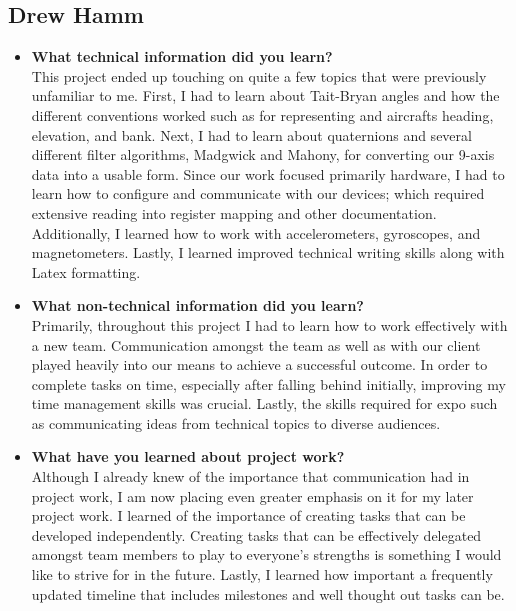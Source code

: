 	\subsection{Drew Hamm}
		\begin{itemize}
			\item \textbf{What technical information did you learn?} \\
				This project ended up touching on quite a few topics that were previously unfamiliar to me.
				First, I had to learn about Tait-Bryan angles and how the different conventions worked such as for representing and aircrafts heading, elevation, and bank.
				Next, I had to learn about quaternions and several different filter algorithms, Madgwick and Mahony, for converting our 9-axis data into a usable form.
				Since our work focused primarily hardware, I had to learn how to configure and communicate with our devices; which required extensive reading into register mapping and other documentation.
				Additionally, I learned how to work with accelerometers, gyroscopes, and magnetometers.
				Lastly, I learned improved technical writing skills along with Latex formatting. \\

			\item \textbf{What non-technical information did you learn?} \\
				Primarily, throughout this project I had to learn how to work effectively with a new team.
				Communication amongst the team as well as with our client played heavily into our means to achieve a successful outcome.
				In order to complete tasks on time, especially after falling behind initially, improving my time management skills was crucial.
				Lastly, the skills required for expo such as communicating ideas from technical topics to diverse audiences. \\

			\item \textbf{What have you learned about project work?} \\
				Although I already knew of the importance that communication had in project work, I am now placing even greater emphasis on it for my later project work.
				I learned of the importance of creating tasks that can be developed independently.
				Creating tasks that can be effectively delegated amongst team members to play to everyone's strengths is something I would like to strive for in the future.
				Lastly, I learned how important a frequently updated timeline that includes milestones and well thought out tasks can be. \\


\end{itemize}
